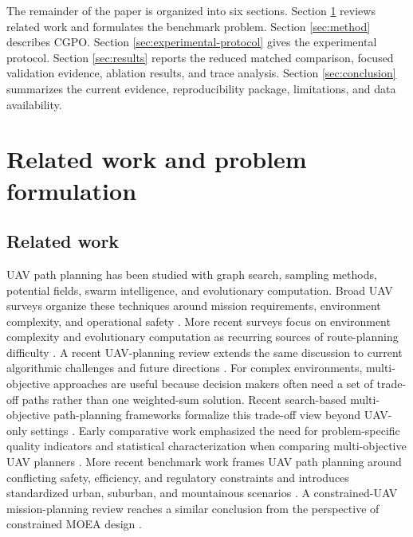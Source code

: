 \documentclass[a4paper,fleqn]{cas-dc}
\begin{document}
The remainder of the paper is organized into six sections. Section \ref{sec:related-work-problem} reviews related work and formulates the benchmark problem. Section \ref{sec:method} describes CGPO. Section \ref{sec:experimental-protocol} gives the experimental protocol. Section \ref{sec:results} reports the reduced matched comparison, focused validation evidence, ablation results, and trace analysis. Section \ref{sec:conclusion} summarizes the current evidence, reproducibility package, limitations, and data availability.

\section{Related work and problem formulation}
\label{sec:related-work-problem}

\subsection{Related work}

UAV path planning has been studied with graph search, sampling methods, potential fields, swarm intelligence, and evolutionary computation. Broad UAV surveys organize these techniques around mission requirements, environment complexity, and operational safety \cite{otto2018uav_civil,aggarwal2020uav_techniques}. More recent surveys focus on environment complexity and evolutionary computation as recurring sources of route-planning difficulty \cite{jones2023uav_survey,jiang2024ec_uav_survey}. A recent UAV-planning review extends the same discussion to current algorithmic challenges and future directions \cite{meng2025uav_advances}. For complex environments, multi-objective approaches are useful because decision makers often need a set of trade-off paths rather than one weighted-sum solution. Recent search-based multi-objective path-planning frameworks formalize this trade-off view beyond UAV-only settings \cite{ren2025emoa}. Early comparative work emphasized the need for problem-specific quality indicators and statistical characterization when comparing multi-objective UAV planners \cite{besada2013uav_comparison}. More recent benchmark work frames UAV path planning around conflicting safety, efficiency, and regulatory constraints and introduces standardized urban, suburban, and mountainous scenarios \cite{darlan2025benchmark}. A constrained-UAV mission-planning review reaches a similar conclusion from the perspective of constrained MOEA design \cite{huang2024uav_cmoea_review}.
\end{document}
